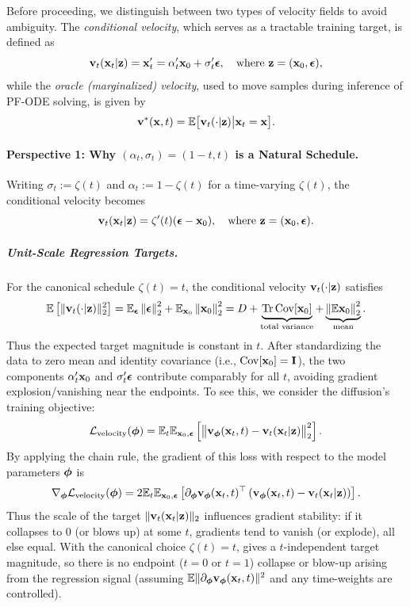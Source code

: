 Before proceeding, we distinguish between two types of velocity fields to avoid ambiguity. The \emph{conditional velocity}, which serves as a tractable training target, is defined as
\[
{\mathbf{v}}_t({\mathbf{x}}_t |{\mathbf{z}}) = {\mathbf{x}}_t' = \alpha_t' {\mathbf{x}}_0 + \sigma_t' {\bm{\epsilon}}, 
\quad \text{where } {\mathbf{z}} = ({\mathbf{x}}_0, {\bm{\epsilon}}),
\]
while the \emph{oracle (marginalized) velocity}, used to move samples during inference of PF-ODE solving, is given by
\[
{\mathbf{v}}^*({\mathbf{x}}, t) = \mathbb{E}\big[{\mathbf{v}}_t(\cdot |{\mathbf{z}})  \big|  {\mathbf{x}}_t = {\mathbf{x}}\big].
\]

\paragraph{Perspective 1: Why $(\alpha_t,\sigma_t)=(1-t,t)$ is a Natural Schedule.}
Writing $\sigma_t:=\zeta(t)$ and $\alpha_t:=1-\zeta(t)$ for a time-varying $\zeta(t)$, the conditional velocity becomes
\[
{\mathbf{v}}_t({\mathbf{x}}_t |{\mathbf{z}})
=\zeta'(t)({\bm{\epsilon}}-{\mathbf{x}}_0),
\quad\text{where } {\mathbf{z}}=({\mathbf{x}}_0,{\bm{\epsilon}}).
\]


\subparagraph{Unit-Scale Regression Targets.}
For the canonical schedule $\zeta(t)=t$, the conditional velocity ${\mathbf{v}}_t(\cdot |{\mathbf{z}})$ satisfies
\begin{align}\label{eq:unit-velocity}
\mathbb{E}\left[\|{\mathbf{v}}_t(\cdot |{\mathbf{z}})\|_2^2\right]
=\mathbb{E}_{{\bm{\epsilon}}}\left\lVert{\bm{\epsilon}}\right\rVert_2^2+\mathbb{E}_{{\mathbf{x}}_0}\left\lVert{\mathbf{x}}_0\right\rVert^2_2 = D + \underbrace{\operatorname{Tr}\mathrm{Cov}[{\mathbf{x}}_0]}_{\text{total variance}}+\underbrace{\left\lVert\mathbb{E}{\mathbf{x}}_0\right\rVert^2_2}_{\text{mean}}.
\end{align}
Thus the expected target magnitude is constant in $t$. After standardizing the data to zero mean and identity covariance (i.e., $\mathrm{Cov}[{\mathbf{x}}_0]={\mathbf{I}}$), the two components
$\alpha_t'{\mathbf{x}}_0$ and $\sigma_t'{\bm{\epsilon}}$ contribute comparably for all $t$, avoiding gradient explosion/vanishing near the endpoints.
To see this, we consider the diffusion's training objective:
\[
\mathcal{L}_{\mathrm{velocity}}({\bm{\phi}})
= \mathbb{E}_{t}  \mathbb{E}_{{\mathbf{x}}_0,{\bm{\epsilon}}}\left[\big\|{\mathbf{v}}_{{\bm{\phi}}}({\mathbf{x}}_t,t) - {\mathbf{v}}_t({\mathbf{x}}_t|{\mathbf{z}})\big\|_2^2
\right].
\]
By applying the chain rule, the gradient of this loss with respect to the model parameters ${\bm{\phi}}$ is
\[
\nabla_{{\bm{\phi}}}\mathcal{L}_{\mathrm{velocity}}({\bm{\phi}})
= 2  \mathbb{E}_{t}  \mathbb{E}_{{\mathbf{x}}_0,{\bm{\epsilon}}} \left[
  \partial_{{\bm{\phi}}}{\mathbf{v}}_{{\bm{\phi}}}({\mathbf{x}}_t,t)^{\top} \left({\mathbf{v}}_{{\bm{\phi}}}({\mathbf{x}}_t,t) - {\mathbf{v}}_t({\mathbf{x}}_t|{\mathbf{z}})\right)
\right].
\]
Thus the scale of the target $\|{\mathbf{v}}_t({\mathbf{x}}_t|{\mathbf{z}})\|_2$ influences gradient stability:
if it collapses to $0$ (or blows up) at some $t$, gradients tend to vanish (or explode), 
all else equal. With the canonical choice $\zeta(t)=t$, 
 gives a $t$-independent target magnitude, so there is no 
endpoint ($t=0$ or $t=1$) collapse or blow-up arising from the regression signal
(assuming $\mathbb{E}\|\partial_{{\bm{\phi}}}{\mathbf{v}}_{{\bm{\phi}}}({\mathbf{x}}_t,t)\|^2$ 
and any time-weights are controlled).


